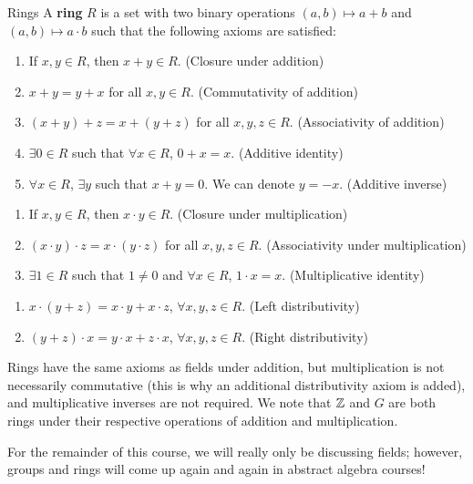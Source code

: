 \begin{ndef}{Rings}
    A \textbf{ring} $R$ is a set with two binary operations $(a,b) \mapsto a + b$ and $(a, b) \mapsto a \cdot b$ such that the following axioms are satisfied:
    \begin{enumerate}[start=1, label={(A\arabic*):}]
        \item If $x, y \in R$, then $x + y \in R$. (Closure under addition)
        \item $x + y = y + x$ for all $x, y \in R$. (Commutativity of addition)
        \item $(x+y) + z = x + (y + z)$ for all $x, y, z \in R$. (Associativity of addition)
        \item $\exists 0 \in R$ such that $\forall x \in R$, $0 + x = x$. (Additive identity)
        \item $\forall x \in R$, $\exists y$ such that $x + y = 0$. We can denote $y = -x$. (Additive inverse)
        \end{enumerate}
        \begin{enumerate}[start=1, label={(M\arabic*):}]
            \item If $x, y \in R$, then $x\cdot y\in R$. (Closure under multiplication)
            \item $(x\cdot y)\cdot z = x \cdot (y \cdot z)$ for all $x, y, z \in R$. (Associativity under multiplication)
            \item $\exists 1 \in R$ such that $1 \neq 0$ and $\forall x \in R$, $1 \cdot x = x$. (Multiplicative identity)
        \end{enumerate}
        \begin{enumerate}[start=1, label={(D\arabic*):}]
            \item $x \cdot (y + z) = x \cdot y + x \cdot z$, $\forall x, y, z \in R$. (Left distributivity)
            \item $(y + z) \cdot x = y \cdot x + z \cdot x$, $\forall x, y, z \in R$. (Right distributivity)
        \end{enumerate}
\end{ndef}
\noindent Rings have the same axioms as fields under addition, but multiplication is not necessarily commutative (this is why an additional distributivity axiom is added), and multiplicative inverses are not required. We note that $\mathbb{Z}$ and $G$ are both rings under their respective operations of addition and multiplication. 

For the remainder of this course, we will really only be discussing fields; however, groups and rings will come up again and again in abstract algebra courses!



